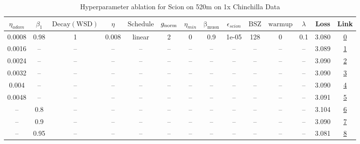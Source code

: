 \begin{table}[H]
\centering
\caption{Hyperparameter ablation for Scion on 520m on 1x Chinchilla Data}
\label{tab:ablation_scion_520m_on_1x_chinchilla_data}
\begin{tabular}{cccccccccccccc}
\toprule
$\eta_{adam}$ & $\beta_1$ & $\mathrm{Decay (WSD)}$ & $\eta$ & $\mathrm{Schedule}$ & $g_{\mathrm{norm}}$ & $\eta_{min}$ & $\mathrm{\beta_{muon}}$ & $\epsilon_{scion}$ & $\mathrm{BSZ}$ & $\mathrm{warmup}$ & $\lambda$ & Loss & Link \\
\midrule
0.0008 & 0.98 & 1 & 0.008 & linear & 2 & 0 & 0.9 & 1e-05 & 128 & 0 & 0.1 & 3.080 & \href{https://wandb.ai/marin-community/optimizer-scaling/runs/sweep-520m-10B-scioncff10blr0.008-wd0.1-minlr0-warmup0-b10.98-gn-c03799}{0} \\
\midrule
0.0016 & -- & -- & -- & -- & -- & -- & -- & -- & -- & -- & -- & 3.089 & \href{https://wandb.ai/marin-community/optimizer-scaling/runs/sweep-520m-10B-sciona0c000lr0.008-wd0.1-minlr0-warmup0-b10.98-gn-d5b09d}{1} \\
0.0024 & -- & -- & -- & -- & -- & -- & -- & -- & -- & -- & -- & 3.090 & \href{https://wandb.ai/marin-community/optimizer-scaling/runs/sweep-520m-10B-sciondcb087lr0.008-wd0.1-minlr0-warmup0-b10.98-gn-292cdc}{2} \\
0.0032 & -- & -- & -- & -- & -- & -- & -- & -- & -- & -- & -- & 3.090 & \href{https://wandb.ai/marin-community/optimizer-scaling/runs/sweep-520m-10B-scion52ef41lr0.008-wd0.1-minlr0-warmup0-b10.98-gn-3e355e}{3} \\
0.004 & -- & -- & -- & -- & -- & -- & -- & -- & -- & -- & -- & 3.090 & \href{https://wandb.ai/marin-community/optimizer-scaling/runs/sweep-520m-10B-scion42bbdflr0.008-wd0.1-minlr0-warmup0-b10.98-gn-a79196}{4} \\
0.0048 & -- & -- & -- & -- & -- & -- & -- & -- & -- & -- & -- & 3.091 & \href{https://wandb.ai/marin-community/optimizer-scaling/runs/sweep-520m-10B-scion1a0f9alr0.008-wd0.1-minlr0-warmup0-b10.98-gn-6eb8c4}{5} \\
-- & 0.8 & -- & -- & -- & -- & -- & -- & -- & -- & -- & -- & 3.104 & \href{https://wandb.ai/marin-community/optimizer-scaling/runs/sweep-520m-10B-scion6a83d1lr0.008-wd0.1-minlr0-warmup0-b10.8-gn2-b778f8}{6} \\
-- & 0.9 & -- & -- & -- & -- & -- & -- & -- & -- & -- & -- & 3.090 & \href{https://wandb.ai/marin-community/optimizer-scaling/runs/sweep-520m-10B-scion8775a0lr0.008-wd0.1-minlr0-warmup0-b10.9-gn2-425030}{7} \\
-- & 0.95 & -- & -- & -- & -- & -- & -- & -- & -- & -- & -- & 3.081 & \href{https://wandb.ai/marin-community/optimizer-scaling/runs/sweep-520m-10B-sciona6fcaalr0.008-wd0.1-minlr0-warmup0-b10.95-gn-87ceb2}{8} \\

\end{tabular}
\end{table}
